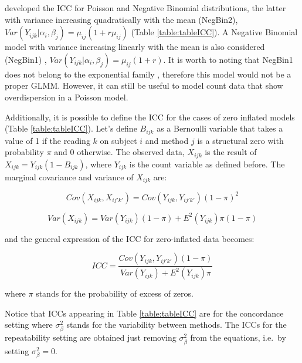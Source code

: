 \citet{carrasco2010} developed the ICC for Poisson and Negative Binomial
distributions, the latter with variance increasing quadratically with
the mean (NegBin2),
\(Var\left(Y_{ijk}|\alpha_i,\beta_j\right)=\mu_{ij} \left(1+r\mu_{ij}\right)\)
(Table \ref{table:tableICC}). A Negative Binomial model with variance
increasing linearly with the mean is also considered (NegBin1)
\citep{brooks2017, hardin2007},
\(Var\left(Y_{ijk}|\alpha_i,\beta_j\right)=\mu_{ij} \left(1+r\right)\).
It is worth to noting that NegBin1 does not belong to the exponential
family \citep{hardin2007}, therefore this model would not be a proper
GLMM. However, it can still be useful to model count data that show
overdispersion in a Poisson model.

Additionally, it is possible to define the ICC for the cases of zero
inflated models (Table \ref{table:tableICC}). Let's define \(B_{ijk}\)
as a Bernoulli variable that takes a value of 1 if the reading \(k\) on
subject \(i\) and method \(j\) is a structural zero with probability
\(\pi\) and 0 otherwise. The observed data, \(X_{ijk}\) is the result of
\(X_{ijk}=Y_{ijk}\left(1-B_{ijk}\right)\), where \(Y_{ijk}\) is the
count variable as defined before. The marginal covariance and variance
of \(X_{ijk}\) are:

\begin{equation}
Cov\left(X_{ijk},X_{ij'k'}\right)=Cov\left(Y_{ijk},Y_{ij'k'}\right)\left(1-\pi\right)^2
\label{eq:cov}
\end{equation}

\begin{equation}
Var\left(X_{ijk}\right)=Var\left(Y_{ijk}\right)\left(1-\pi\right)+E^2\left(Y_{ijk}\right)\pi\left(1-\pi\right)
\label{eq:var}
\end{equation}

and the general expression of the ICC for zero-inflated data becomes:

\begin{equation}
ICC=\frac{Cov\left(Y_{ijk},Y_{ij'k'}\right)\left(1-\pi\right)}{Var\left(Y_{ijk}\right)+E^2\left(Y_{ijk}\right)\pi}
\label{eq:icc3}
\end{equation}

where \(\pi\) stands for the probability of excess of zeros.

Notice that ICCs appearing in Table \ref{table:tableICC} are for the
concordance setting where \(\sigma^2_\beta\) stands for the variability
between methods. The ICCs for the repeatability setting are obtained
just removing \(\sigma^2_\beta\) from the equations, i.e.~by setting
\(\sigma^2_\beta=0\).

